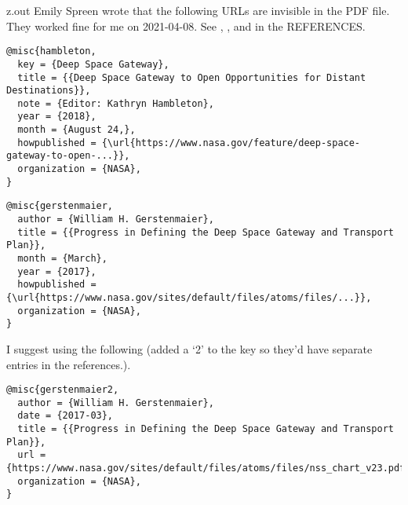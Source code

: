 \begin{VerbatimOut}{z.out}
  Emily Spreen wrote that the following URLs are invisible in the PDF file.
  They worked fine for me on 2021-04-08.
  See \cite{hambleton}, \cite{gerstenmaier}, and \cite{gerstenmaier2} in the REFERENCES.

{\footnotesize
\begin{verbatim}
@misc{hambleton,
  key = {Deep Space Gateway},
  title = {{Deep Space Gateway to Open Opportunities for Distant Destinations}},
  note = {Editor: Kathryn Hambleton},
  year = {2018},
  month = {August 24,},
  howpublished = {\url{https://www.nasa.gov/feature/deep-space-gateway-to-open-...}},
  organization = {NASA},
}
\end{verbatim}
}

{\footnotesize
\begin{verbatim}
@misc{gerstenmaier,
  author = {William H. Gerstenmaier},
  title = {{Progress in Defining the Deep Space Gateway and Transport Plan}},
  month = {March},
  year = {2017},
  howpublished = {\url{https://www.nasa.gov/sites/default/files/atoms/files/...}},
  organization = {NASA},
}
\end{verbatim}
}

I suggest using the following
(added a `2' to the key so they'd have separate entries in the references.).
{\footnotesize
\begin{verbatim}
@misc{gerstenmaier2,
  author = {William H. Gerstenmaier},
  date = {2017-03},
  title = {{Progress in Defining the Deep Space Gateway and Transport Plan}},
  url = {https://www.nasa.gov/sites/default/files/atoms/files/nss_chart_v23.pdf},
  organization = {NASA},
}
\end{verbatim}
}
\end{VerbatimOut}



\MyIO
